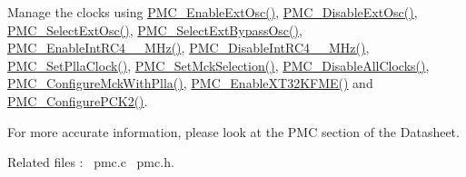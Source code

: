 \begin{DoxyItemize}
\item Manage the clocks using \mbox{\hyperlink{atsam_2contrib_2libraries_2libchip_2source_2pmc_8c_a9cdd9f6f0a26e610daf0553928018371}{P\+M\+C\+\_\+\+Enable\+Ext\+Osc()}}, \mbox{\hyperlink{atsam_2contrib_2libraries_2libchip_2source_2pmc_8c_a011102ee33b21ca80407a3af59ac2549}{P\+M\+C\+\_\+\+Disable\+Ext\+Osc()}}, \mbox{\hyperlink{atsam_2contrib_2libraries_2libchip_2source_2pmc_8c_abe6fb2019daf734e733fb95c36faece8}{P\+M\+C\+\_\+\+Select\+Ext\+Osc()}}, \mbox{\hyperlink{atsam_2contrib_2libraries_2libchip_2source_2pmc_8c_a0953cfd4133563007de5a17fd4891b38}{P\+M\+C\+\_\+\+Select\+Ext\+Bypass\+Osc()}}, \mbox{\hyperlink{atsam_2contrib_2libraries_2libchip_2source_2pmc_8c_ad9f77d46b39ee3dfc7625ca28366c080}{P\+M\+C\+\_\+\+Enable\+Int\+R\+C4\+\_\+\_\+M\+Hz()}}, \mbox{\hyperlink{atsam_2contrib_2libraries_2libchip_2source_2pmc_8c_a1ee2f3bdfda0aadc728aa36d13a3371e}{P\+M\+C\+\_\+\+Disable\+Int\+R\+C4\+\_\+\_\+M\+Hz()}}, \mbox{\hyperlink{atsam_2contrib_2libraries_2libchip_2source_2pmc_8c_a009f9a3d93428949ca9259f4761381a1}{P\+M\+C\+\_\+\+Set\+Plla\+Clock()}}, \mbox{\hyperlink{atsam_2contrib_2libraries_2libchip_2source_2pmc_8c_a42c60c846653995b36b8e76330895326}{P\+M\+C\+\_\+\+Set\+Mck\+Selection()}}, \mbox{\hyperlink{atsam_2contrib_2libraries_2libchip_2source_2pmc_8c_a388ea73a2dc727baaefb9f11edf9bf56}{P\+M\+C\+\_\+\+Disable\+All\+Clocks()}}, \mbox{\hyperlink{atsam_2contrib_2libraries_2libchip_2source_2pmc_8c_a2d4ef8737585f8d3f91ec9d9f205b570}{P\+M\+C\+\_\+\+Configure\+Mck\+With\+Plla()}}, \mbox{\hyperlink{atsam_2contrib_2libraries_2libchip_2source_2pmc_8c_aec705190fa14349d93b3810961b40cc1}{P\+M\+C\+\_\+\+Enable\+X\+T32\+K\+F\+M\+E()}} and \mbox{\hyperlink{atsam_2contrib_2libraries_2libchip_2source_2pmc_8c_a71685a1121066ca59e05d677c3bff413}{P\+M\+C\+\_\+\+Configure\+P\+C\+K2()}}.


\end{DoxyItemize}For more accurate information, please look at the P\+MC section of the Datasheet.

Related files \+:~\newline
pmc.\+c~\newline
 pmc.\+h.~\newline
 